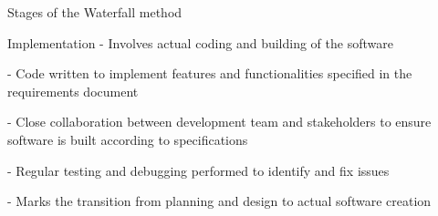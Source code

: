 \begin{frame}{Stages of the Waterfall method}

    \begin{block}{Implementation}
        - Involves actual coding and building of the software
        
        - Code written to implement features and functionalities specified in the requirements document
        
        - Close collaboration between development team and stakeholders to ensure software is built according to specifications
        
        - Regular testing and debugging performed to identify and fix issues
        
        - Marks the transition from planning and design to actual software creation
        
    \end{block}   

\end{frame}